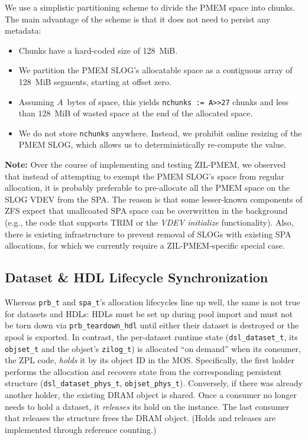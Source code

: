\documentclass[12pt,a4paper,twoside]{book}
\begin{document}
{We use a simplistic partitioning scheme to divide the PMEM space into chunks.
The main advantage of the scheme is that it does not need to persist any metadata:
\begin{itemize}[noitemsep]
    \item Chunks have a hard-coded size of 128~MiB.
    \item We partition the PMEM SLOG's allocatable space as a contiguous array of 128~MiB segments, starting at offset zero.
    \item Assuming $A$~bytes of space, this yields \lstinline{nchunks := A>>27} chunks and less than 128~MiB of wasted space at the end of the allocated space.
    \item We do not store \lstinline{nchunks} anywhere. Instead, we prohibit online resizing of the PMEM SLOG, which allows us to deterministically re-compute the value.
\end{itemize}

\textbf{Note:} Over the course of implementing and testing ZIL-PMEM, we observed that instead of attempting to exempt the PMEM SLOG's space from regular allocation, it is probably preferable to pre-allocate all the PMEM space on the SLOG VDEV from the SPA.
The reason is that some lesser-known components of ZFS expect that unallcoated SPA space can be overwritten in the background (e.g., the code that supports TRIM or the \textit{VDEV initialize} functionality).
Also, there is existing infrastructure to prevent removal of SLOGs with existing SPA allocations, for which we currently require a ZIL-PMEM-specific special case.

\subsection{Dataset \& HDL Lifecycle Synchronization}\label{sec:zilpmem:hdllifecycle}
Whereas \lstinline{prb_t} and \lstinline{spa_t}'s allocation lifecycles line up well, the same is not true for datasets and HDLs:
HDLs must be set up during pool import and must not be torn down via \lstinline{prb_teardown_hdl} until either their dataset is destroyed or the zpool is exported.
In contrast, the per-dataset runtime state (\lstinline{dsl_dataset_t}, its \lstinline{objset_t} and the objset's \lstinline{zilog_t}) is allocated ``on demand'' when its consumer, the ZPL code, \textit{holds} it by its object ID in the MOS.
Specifically, the first holder performs the allocation and recovers state from the corresponding persistent structure (\lstinline{dsl_dataset_phys_t}, \lstinline{objset_phys_t}).
Conversely, if there was already another holder, the existing DRAM object is shared.
Once a consumer no longer needs to hold a dataset, it \textit{releases} its hold on the instance.
The last consumer that releases the structure frees the DRAM object.
(Holds and releases are implemented through reference counting.)

}
\end{document}
